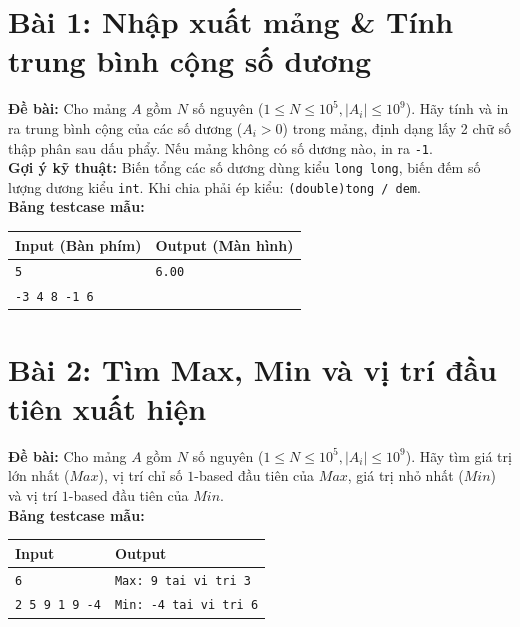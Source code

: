 \documentclass[11pt,a4paper]{article}
\begin{document}
\section*{\color{AsianDarkBlue}Bài 1: Nhập xuất mảng \& Tính trung bình cộng số dương}
\textbf{Đề bài:} Cho mảng $A$ gồm $N$ số nguyên ($1 \le N \le 10^5, |A_i| \le 10^9$). Hãy tính và in ra trung bình cộng của các số dương ($A_i > 0$) trong mảng, định dạng lấy 2 chữ số thập phân sau dấu phẩy. Nếu mảng không có số dương nào, in ra \texttt{-1}.\\
\textbf{Gợi ý kỹ thuật:} Biến tổng các số dương dùng kiểu \texttt{long long}, biến đếm số lượng dương kiểu \texttt{int}. Khi chia phải ép kiểu: \texttt{(double)tong / dem}.\\
\textbf{Bảng testcase mẫu:}
\begin{table}[h!]
\centering\small
\begin{tabular}{|p{7.5cm}|p{7.5cm}|}
\hline
\textbf{Input (Bàn phím)} & \textbf{Output (Màn hình)} \\ \hline
\texttt{5} & \texttt{6.00} \\
\texttt{-3 4 8 -1 6} & \\ \hline
\end{tabular}
\end{table}

\section*{\color{AsianDarkBlue}Bài 2: Tìm Max, Min và vị trí đầu tiên xuất hiện}
\textbf{Đề bài:} Cho mảng $A$ gồm $N$ số nguyên ($1 \le N \le 10^5, |A_i| \le 10^9$). Hãy tìm giá trị lớn nhất ($Max$), vị trí chỉ số $1$-based đầu tiên của $Max$, giá trị nhỏ nhất ($Min$) và vị trí $1$-based đầu tiên của $Min$.\\
\textbf{Bảng testcase mẫu:}
\begin{table}[h!]
\centering\small
\begin{tabular}{|p{7.5cm}|p{7.5cm}|}
\hline
\textbf{Input} & \textbf{Output} \\ \hline
\texttt{6} & \texttt{Max: 9 tai vi tri 3} \\
\texttt{2 5 9 1 9 -4} & \texttt{Min: -4 tai vi tri 6} \\ \hline
\end{tabular}
\end{table}

\newpage
\end{document}
